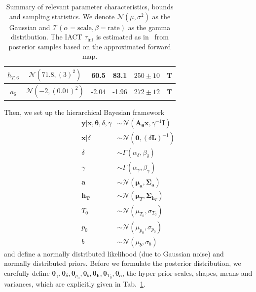 \begin{table}
\begin{tabular}{ |c||c|c|c|c|c|   }
		$h_{T,6}$ &  $\mathcal{N}(71.8,(3)^2)$&60.5 &83.1&$250\pm 10$&$\bm{T}$\\ \hline
		$a_{6}$ & $\mathcal{N}(-2,(0.01)^2)$ &-2.04 &-1.96&$272\pm 12$&$\bm{T}$\\
		\hline
	\end{tabular}
	\caption[Summary of relevant parameter characteristics, bounds and sampling statistics.]{Summary of relevant parameter characteristics, bounds and sampling statistics. We denote $\mathcal{N}(\mu,\sigma^2)$ as the Gaussian and $\mathcal{T}(\alpha = \text{scale}, \beta = \text{rate})$ as the gamma distribution. The IACT $\tau_{\text{int}}$ is estimated as in~\cite{UwerrM} from posterior samples based on the approximated forward map.}
	\label{tab:priors}
\end{table}

Then, we set up the hierarchical Bayesian framework
\begin{subequations}
	\label{eq:BayMode}
	\begin{align}
		\bm{y} |  \bm{x},\bm{\theta},\delta,\gamma  &\sim \mathcal{N}(\bm{A}_{\bm{\theta}}  \bm{x}, \gamma^{-1} \bm{I}) \label{eq:likelihoodFull} \\
		\bm{x}| \delta  &\sim \mathcal{N}(\bm{0}, (\delta \bm{L})^{-1} ) \label{eq:priorXFull} \\
		\delta  &\sim \Gamma(\alpha_{\delta} , \beta_{\delta} )\label{eq:priorDelFull} \\
		\gamma  &\sim \Gamma(\alpha_{\gamma}, \beta_{\gamma})\label{eq:priorGamFull} \\
		\bm{a}  &\sim \mathcal{N}(\bm{\mu}_{\bm{a}}, \bm{\Sigma}_{\bm{a}})\\
		\bm{h}_{\bm{T}}  &\sim \mathcal{N}(\bm{\mu}_{T}, \bm{\Sigma}_{\bm{h}_T}) \\
		T_0  &\sim \mathcal{N}(\mu_{T_0}, \sigma_{T_0} )\\
		p_0  &\sim \mathcal{N}(\mu_{p_0}, \sigma_{p_0} )\\
		b  &\sim \mathcal{N}(\mu_b, \sigma_b )
	\end{align}
\end{subequations}
and define a normally distributed likelihood (due to Gaussian noise) and normally distributed priors.
Before we formulate the posterior distribution, we carefully define $\bm{\theta}_{\gamma}, \bm{\theta}_{\delta},\bm{\theta}_{p_0},\bm{\theta}_{b},\bm{\theta}_{\bm{h}},\bm{\theta}_{T_0},\bm{\theta}_{\bm{a}}$, the hyper-prior scales, shapes, means and variances, which are explicitly given in Tab.~\ref{tab:priors}.

